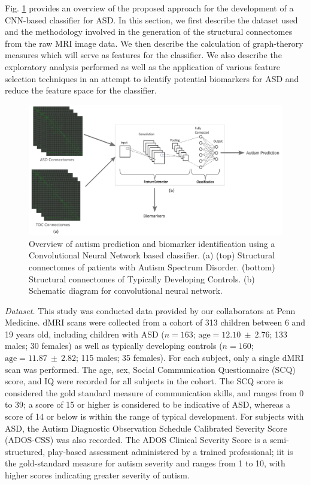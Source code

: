 \documentclass[10pt,conference]{IEEEtran}
\begin{document}
Fig. \ref{project-schematic} provides an overview of the proposed approach for the 
development of a CNN-based classifier for ASD. In this section, we first describe the 
dataset used and the methodology involved in the generation of the structural connectomes 
from the raw MRI image data. We then describe the calculation of graph-therory measures
which will serve as features for the classifier. We also describe the exploratory analysis 
performed as well as the application of various feature selection techniques in an attempt
to identify potential biomarkers for ASD and reduce the feature space for the classifier.

\begin{figure}[ht]
    \vskip 0.2in
    \begin{center}
        \centerline{\includegraphics[width=6in]{../img/project_schematic_v1.png}}
        \caption{
            Overview of autism prediction and biomarker identification using a 
            Convolutional Neural Network based classifier. (a) (top) Structural 
            connectomes of patients with Autism Spectrum Disorder. (bottom) Structural 
            connectomes of Typically Developing Controls. (b) Schematic diagram for 
            convolutional neural network.
        }
        \label{project-schematic}
    \end{center}
    \vskip -0.2in
\end{figure}

\textit{Dataset.} This study was conducted data provided by our collaborators at Penn 
Medicine. dMRI scans were collected from a cohort of 313 children between 6 and 19 years
old, including children with ASD ($n=163$; $\text{age}=12.10~\pm~2.76$; 133 males; 30 females) 
as  well as typically developing controls ($n=160$; $\text{age}=11.87~\pm~2.82$; 115 males; 35 females). 
For each subject, only a single dMRI scan was performed. The age, sex, Social 
Communication Questionnaire (SCQ) score, and IQ were recorded for all subjects in the 
cohort. The SCQ score is considered the gold standard measure of communication skills,
and ranges from 0 to 39; a score of 15 or higher is considered to be indicative of ASD, 
whereas a score of 14 or below is within the range of typical development. For subjects 
with ASD, the Autism Diagnostic Observation Schedule Calibrated Severity Score (ADOS-CSS) 
was also recorded. The ADOS Clinical Severity Score is a semi-structured, play-based 
assessment administered by a trained professional; iit is the gold-standard measure for 
autism severity and ranges from 1 to 10, with higher scores indicating greater severity 
of autism.
\end{document}
